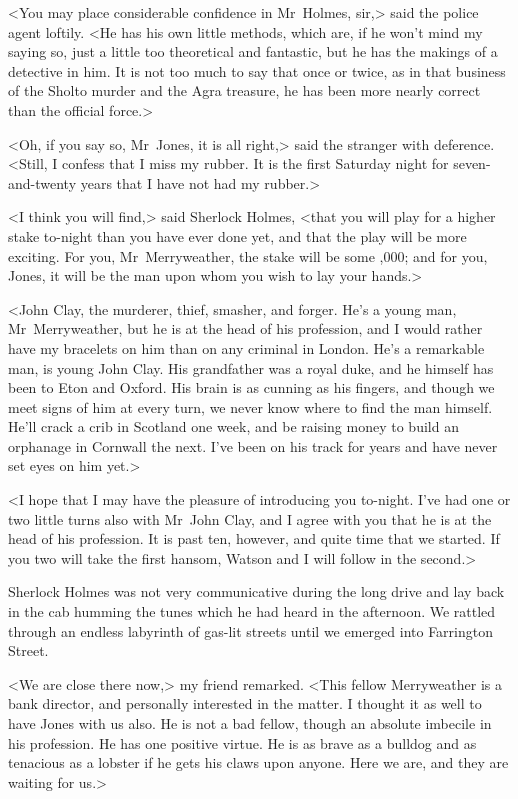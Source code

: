 <You may place considerable confidence in Mr~Holmes, sir,> said the police agent loftily. <He has his own little methods, which are, if he won't mind my saying so, just a little too theoretical and fantastic, but he has the makings of a detective in him. It is not too much to say that once or twice, as in that business of the Sholto murder and the Agra treasure, he has been more nearly correct than the official force.>

<Oh, if you say so, Mr~Jones, it is all right,> said the stranger with deference. <Still, I confess that I miss my rubber. It is the first Saturday night for seven-and-twenty years that I have not had my rubber.>

<I think you will find,> said Sherlock Holmes, <that you will play for a higher stake to-night than you have ever done yet, and that the play will be more exciting. For you, Mr~Merryweather, the stake will be some ,000; and for you, Jones, it will be the man upon whom you wish to lay your hands.>

<John Clay, the murderer, thief, smasher, and forger. He's a young man, Mr~Merryweather, but he is at the head of his profession, and I would rather have my bracelets on him than on any criminal in London. He's a remarkable man, is young John Clay. His grandfather was a royal duke, and he himself has been to Eton and Oxford. His brain is as cunning as his fingers, and though we meet signs of him at every turn, we never know where to find the man himself. He'll crack a crib in Scotland one week, and be raising money to build an orphanage in Cornwall the next. I've been on his track for years and have never set eyes on him yet.>

<I hope that I may have the pleasure of introducing you to-night. I've had one or two little turns also with Mr~John Clay, and I agree with you that he is at the head of his profession. It is past ten, however, and quite time that we started. If you two will take the first hansom, Watson and I will follow in the second.>

Sherlock Holmes was not very communicative during the long drive and lay back in the cab humming the tunes which he had heard in the afternoon. We rattled through an endless labyrinth of gas-lit streets until we emerged into Farrington Street.

<We are close there now,> my friend remarked. <This fellow Merryweather is a bank director, and personally interested in the matter. I thought it as well to have Jones with us also. He is not a bad fellow, though an absolute imbecile in his profession. He has one positive virtue. He is as brave as a bulldog and as tenacious as a lobster if he gets his claws upon anyone. Here we are, and they are waiting for us.>

